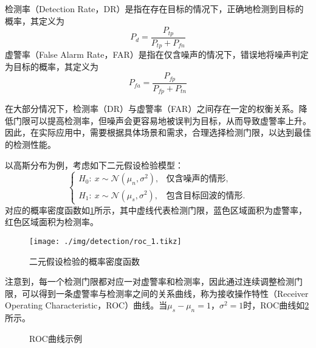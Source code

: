 检测率（Detection Rate，DR）是指在存在目标的情况下，正确地检测到目标的概率，其定义为
\[
    P_d = \frac{P_{tp}}{P_{tp} + P_{fn}}
\]
虚警率（False Alarm Rate，FAR）是指在仅含噪声的情况下，错误地将噪声判定为目标的概率，其定义为
\[
    P_{fa} = \frac{P_{fp}}{P_{fp} + P_{tn}}
\]

在大部分情况下，检测率（DR）与虚警率（FAR）之间存在一定的权衡关系。降低门限可以提高检测率，但噪声会更容易地被误判为目标，从而导致虚警率上升。因此，在实际应用中，需要根据具体场景和需求，合理选择检测门限，以达到最佳的检测性能。

以高斯分布为例，考虑如下二元假设检验模型：
\[
    \begin{cases}
        H_0:~ x \sim \mathcal{N}(\mu_n, \sigma^2), & \text{仅含噪声的情形},   \\
        H_1:~ x \sim \mathcal{N}(\mu_s, \sigma^2), & \text{包含目标回波的情形}.
    \end{cases}
\]
对应的概率密度函数如\cref{fig_dect_prob}所示，其中虚线代表检测门限，蓝色区域面积为虚警率，红色区域面积为检测率。

\begin{figure}[htb!]
    \centering
    \texttt{[image: ./img/detection/roc\_1.tikz]}
    \caption{二元假设检验的概率密度函数}
    \label{fig_dect_prob}
\end{figure}

注意到，每一个检测门限都对应一对虚警率和检测率，因此通过连续调整检测门限，可以得到一条虚警率与检测率之间的关系曲线，称为接收操作特性（Receiver Operating Characteristic，ROC）曲线。当\( \mu_s - \mu_n = 1 \)，\( \sigma^2 = 1 \)时，ROC曲线如\cref{fig_roc_curve_1}所示。

\begin{figure}[htb!]
    \centering
    \caption{ROC曲线示例}
    \label{fig_roc_curve_1}
\end{figure}


